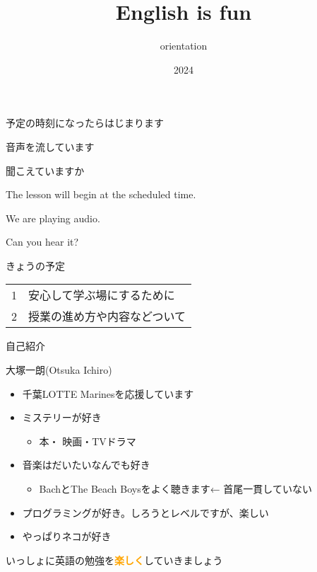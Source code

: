 \documentclass[
  ignorenonframetext,
  aspectratio=169,
  xcolor=dvipsnames]{beamer}
\title{English is fun}
\subtitle{orientation}
\author{}
\date{\vspace{-2.5em}2024}
\providecommand{\tightlist}{%
  \setlength{\itemsep}{0pt}\setlength{\parskip}{0pt}}
\begin{document}
\frame{\titlepage}

\begin{frame}{}
\label{section}
\thispagestyle{empty}
\Large

\raggedright

予定の時刻になったらはじまります

\textbullet  音声を流しています

\textbullet  聞こえていますか　

\vfill

\raggedleft

The lesson will begin at the scheduled time.

\vspace{-6pt}

We are playing audio.

\vspace{-6pt}

Can you hear it?
\end{frame}

\begin{frame}{}
\label{section-1}
\thispagestyle{empty}
\titlepage
\end{frame}

\begin{frame}{きょうの予定}
\label{ux304dux3087ux3046ux306eux4e88ux5b9a}
\thispagestyle{empty}
\LARGE

\begin{tabular}{rl}
1&安心して学ぶ場にするために\\
2&授業の進め方や内容などついて
\end{tabular}
\end{frame}

\begin{frame}{自己紹介}
\label{ux81eaux5df1ux7d39ux4ecb}
\thispagestyle{empty}
\Large

\pause

大塚一朗(Otsuka Ichiro)

\pause

\begin{itemize}[<+->]
\tightlist
\item
  千葉LOTTE Marinesを応援しています
\item
  ミステリーが好き

  \begin{itemize}[<+->]
  \tightlist
  \item
    本・ 映画・TVドラマ
  \end{itemize}
\item
  音楽はだいたいなんでも好き

  \begin{itemize}[<+->]
  \tightlist
  \item
    BachとThe Beach Boysをよく聴きます\pause  ← 首尾一貫していない
  \end{itemize}
\item
  プログラミングが好き。しろうとレベルですが、楽しい
\item
  やっぱりネコが好き \pause
\end{itemize}

いっしょに英語の勉強を\textcolor{Orange}{\bfseries 楽しく}していきましょう
\end{frame}
\end{document}
